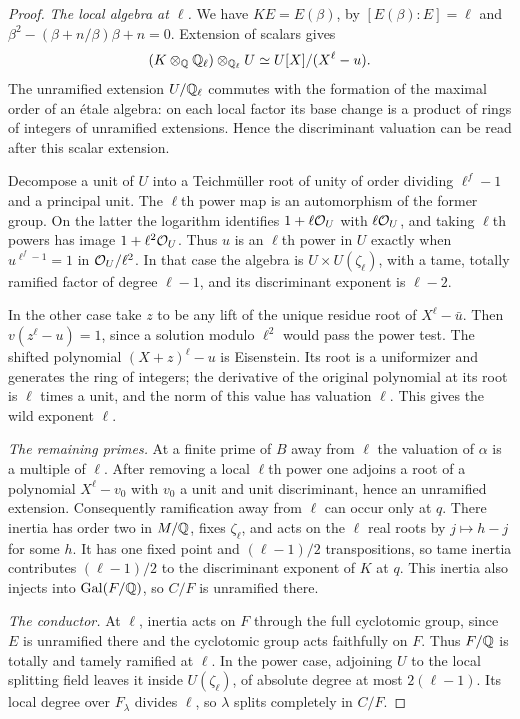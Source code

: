 \begin{proof}
\emph{The local algebra at $\ell$.} We have $KE=E(\beta)$, by $[E(\beta):E]=\ell$ and
$\beta^2-(\beta+n/\beta)\beta+n=0$. Extension of scalars gives
\[
 (K\otimes_{\mathbb{Q}}\mathbb{Q}_\ell)\otimes_{\mathbb{Q}_\ell}U\simeq U[X]/(X^\ell-u).
\]
The unramified extension $U/\mathbb{Q}_\ell$ commutes with the formation of the maximal order
of an \'etale algebra: on each local factor its base change is a product of rings of
integers of unramified extensions. Hence the discriminant valuation can be read after
this scalar extension.

Decompose a unit of $U$ into a Teichm\"uller root of unity of order dividing
$\ell^f-1$ and a principal unit. The $\ell$th power map is an automorphism of the
former group. On the latter the logarithm identifies $1+\ell\mathcal{O}_U$ with $\ell\mathcal{O}_U$,
and taking $\ell$th powers has image $1+\ell^2\mathcal{O}_U$. Thus $u$ is an $\ell$th power in
$U$ exactly when $u^{\ell^f-1}=1$ in $\mathcal{O}_U/\ell^2$. In that case the algebra is
$U\times U(\zeta_\ell)$, with a tame, totally ramified factor of degree $\ell-1$, and
its discriminant exponent is $\ell-2$.

In the other case take $z$ to be any lift of the unique residue root of
$X^\ell-\bar u$. Then $v(z^\ell-u)=1$, since a solution modulo $\ell^2$ would pass the
power test. The shifted polynomial $(X+z)^\ell-u$ is Eisenstein. Its root is a
uniformizer and generates the ring of integers; the derivative of the original
polynomial at its root is $\ell$ times a unit, and the norm of this value has valuation
$\ell$. This gives the wild exponent $\ell$.

\emph{The remaining primes.} At a finite prime of $B$ away from $\ell$ the valuation of
$\alpha$ is a multiple of $\ell$. After removing a local $\ell$th power one adjoins a
root of a polynomial $X^\ell-v_0$ with $v_0$ a unit and unit discriminant, hence an
unramified extension. Consequently ramification away from $\ell$ can occur only at $q$.
There inertia has order two in $M/\mathbb{Q}$, fixes $\zeta_\ell$, and acts on the $\ell$ real
roots by $j\mapsto h-j$ for some $h$. It has one fixed point and $(\ell-1)/2$
transpositions, so tame inertia contributes $(\ell-1)/2$ to the discriminant exponent
of $K$ at $q$. This inertia also injects into $\operatorname{Gal}(F/\mathbb{Q})$, so $C/F$ is unramified
there.

\emph{The conductor.} At $\ell$, inertia acts on $F$ through the full cyclotomic group,
since $E$ is unramified there and the cyclotomic group acts faithfully on $F$. Thus
$F/\mathbb{Q}$ is totally and tamely ramified at $\ell$. In the power case, adjoining $U$ to
the local splitting field leaves it inside $U(\zeta_\ell)$, of absolute degree at most
$2(\ell-1)$. Its local degree over $F_\lambda$ divides $\ell$, so $\lambda$ splits
completely in $C/F$.


\end{proof}
